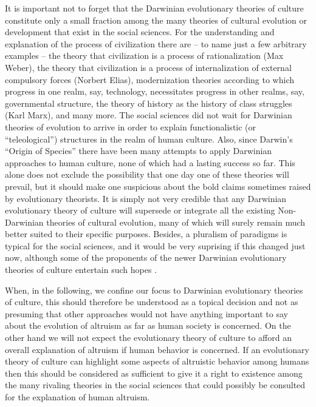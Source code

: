 It is important not to forget that the Darwinian evolutionary theories of
culture constitute only a small fraction among the many theories of cultural
evolution or development that exist in the social sciences. For the
understanding and explanation of the process of civilization there are -- to
name just a few arbitrary examples -- the theory that civilization is a
process of rationalization (Max Weber), the theory that civilization is a
process of internalization of external compulsory forces (Norbert Elias),
modernization theories according to which progress in one realm, say,
technology, necessitates progress in other realms, say, governmental structure,
the theory of history as the history of class struggles (Karl Marx), and many
more. The social sciences did not wait for Darwinian theories of evolution
to arrive in order to explain functionalistic (or ``teleological'') structures
in the realm of human culture. Also, since Darwin's ``Origin of Species''
\cite[]{darwin:1859} there have been many attempts to apply Darwinian
approaches to human culture, none of which had a lasting success so far. This
alone does not exclude the possibility that one day one of these theories will
prevail, but it should make one suspicious about the bold claims sometimes
raised by evolutionary theorists. It is simply not very credible that any
Darwinian evolutionary theory of culture will supersede or integrate all the
existing Non-Darwinian theories of cultural evolution, many of which will
surely remain much better suited to their specific purposes. Besides, a
pluralism of paradigms is typical for the social sciences, and it would be very
suprising if this changed just now, although some of the proponents of the
newer Darwinian evolutionary theories of culture entertain such hopes
\cite[]{tooby-cosmides:1992, mesoudi-laland-whiten:2006}.

When, in the following, we confine our focus to Darwinian evolutionary
theories of culture, this should therefore be understood as a topical decision
and not as presuming that other approaches would not have anything important
to say about the evolution of altruism as far as human society is concerned.
On the other hand we will not expect the evolutionary theory of culture to
afford an overall explanation of altruism if human behavior is concerned. If
an evolutionary theory of culture can highlight some aspects of altruistic
behavior among humans then this should be considered as sufficient to give it
a right to existence among the many rivaling theories in the social sciences
that could possibly be consulted for the explanation of human altruism.

